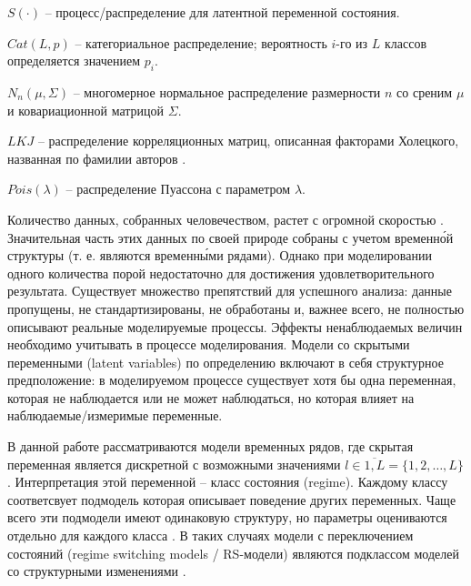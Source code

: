 \documentclass[a4paper,14pt]{extreport}
\begin{document}
$S(\cdot)$ -- процесс/распределение для латентной переменной состояния.

$\mathit{Cat}(L, p)$ -- категориальное распределение; вероятность $i$-го из $L$ классов определяется значением $p_i$.

$N_n(\mu, \Sigma)$ -- многомерное нормальное распределение размерности $n$ со среним $\mu$ и ковариационной матрицой $\Sigma$.

$\mathit{LKJ}$ -- распределение корреляционных матриц, описанная факторами Холецкого, названная по фамилии авторов \cite{lkj_prior}. 

$\mathit{Pois}(\lambda)$ -- распределение Пуассона с параметром $\lambda$.




Количество данных, собранных человечеством, растет с огромной скоростью \cite{idc_data_2025}. Значительная часть этих данных по своей природе собраны с учетом временн\'{о}й структуры (т. е. являются временн\'{ы}ми рядами). Однако при моделировании одного количества порой недостаточно для достижения удовлетворительного результата. Существует множество препятствий для успешного анализа: данные пропущены, не стандартизированы, не обработаны и, важнее всего, не полностью описывают реальные моделируемые процессы. Эффекты ненаблюдаемых величин необходимо учитывать в процессе моделирования. Модели со скрытыми переменными (latent variables) по определению включают в себя структурное предположение: в моделируемом процессе существует хотя бы одна переменная, которая не наблюдается или не может наблюдаться, но которая влияет на наблюдаемые/измеримые переменные.

В данной работе рассматриваются модели временных рядов, где скрытая переменная является дискретной с возможными значениями $l \in \overline{1,L} = \{1,2,\dots,L\}$. Интерпретация этой переменной -- класс состояния (regime). Каждому классу соответсвует подмодель которая описывает поведение других переменных. Чаще всего эти подмодели имеют одинаковую структуру, но параметры оцениваются отдельно для каждого класса . В таких случаях модели с переключением состояний (regime switching models / RS-модели) являются подклассом моделей со структурными изменениями \cite{mal_multidim_nonhomogenous}.
\end{document}
